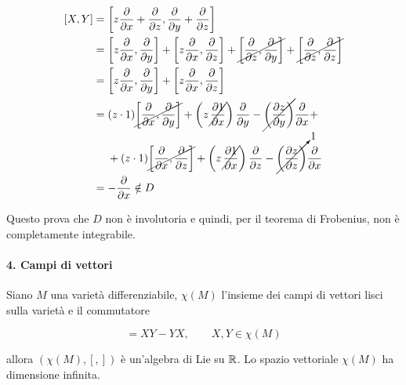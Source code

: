 \begin{align}
	\begin{split}
		[X,Y] &= \left[ z \dfrac{\partial}{\partial x} + \dfrac{\partial}{\partial z} , \dfrac{\partial}{\partial y} + \dfrac{\partial}{\partial z} \right]\\
		&= \left[ z \dfrac{\partial}{\partial x}, \dfrac{\partial}{\partial y} \right] + \left[ z \dfrac{\partial}{\partial x}, \dfrac{\partial}{\partial z} \right] + \cancel{\left[ \dfrac{\partial}{\partial z}, \dfrac{\partial}{\partial y} \right]} + \cancel{\left[ \dfrac{\partial}{\partial z}, \dfrac{\partial}{\partial z} \right]}\\
		&= \left[ z \dfrac{\partial}{\partial x}, \dfrac{\partial}{\partial y} \right] + \left[ z \dfrac{\partial}{\partial x}, \dfrac{\partial}{\partial z} \right]\\
		&= (z \cdot 1) \cancel{\left[ \dfrac{\partial}{\partial x}, \dfrac{\partial}{\partial y} \right]} + \left( z \, \cancel{\dfrac{\partial 1}{\partial x}} \right) \dfrac{\partial}{\partial y} - \cancel{\left( \dfrac{\partial z}{\partial y} \right)} \dfrac{\partial}{\partial x} + \\
		& \hal + (z \cdot 1) \cancel{\left[ \dfrac{\partial}{\partial x}, \dfrac{\partial}{\partial z} \right]} + \left( z \, \cancel{\dfrac{\partial 1}{\partial x}} \right) \dfrac{\partial}{\partial z} - \cancelto{1}{\left( \dfrac{\partial z}{\partial z} \right)} \dfrac{\partial}{\partial x}\\
		&= - \dfrac{\partial}{\partial x} \notin D
	\end{split}
\end{align}

Questo prova che $ D $ non è involutoria e quindi, per il teorema di Frobenius, non è completamente integrabile.

\paragraph{4. Campi di vettori}

Siano $ M $ una varietà differenziabile, $ \chi(M) $ l'insieme dei campi di vettori lisci sulla varietà e il commutatore

\begin{equation}
	[X,Y] = XY - YX, \qquad X,Y \in \chi(M)
\end{equation}

allora $ (\chi(M),[,]) $ è un'algebra di Lie su $ \mathbb{R} $. Lo spazio vettoriale $ \chi(M) $ ha dimensione infinita.

